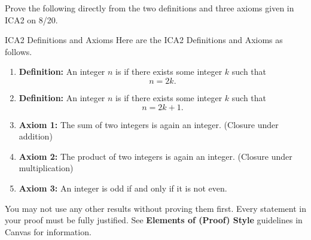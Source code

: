


  \item 
  Prove the following directly from the two definitions and three axioms
  given in ICA2 on 8/20.
  \begin{define}{ICA2 Definitions and Axioms}
    Here are the ICA2 Definitions and Axioms as follows.
    \begin{enumerate}
      \item \textbf{Definition:} An integer $n$ is  if there exists some integer $k$ such that
      \[
      n = 2k.
      \]
      \item \textbf{Definition:} An integer $n$ is  if there exists some integer $k$ such that
      \[
      n = 2k + 1.
      \]
      \item \textbf{Axiom 1:} The sum of two integers is again an integer. (Closure under addition)
      \item \textbf{Axiom 2:} The product of two integers is again an integer. (Closure under multiplication)
      \item \textbf{Axiom 3:} An integer is odd if and only if it is not even.
    \end{enumerate}
  \end{define}
  You may not use any other results without proving them first.
  Every statement in your proof must be fully justified.
  See \textbf{Elements of (Proof) Style} guidelines in Canvas for information.
